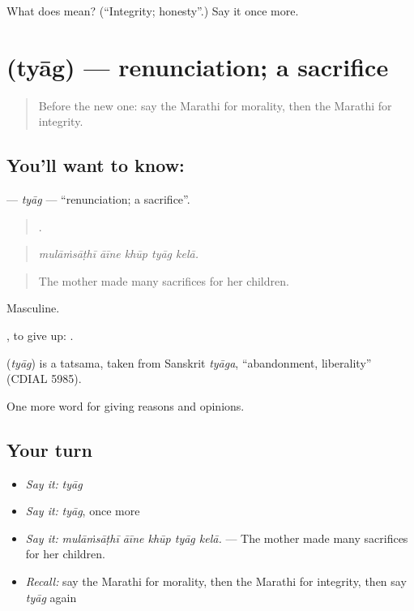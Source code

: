 \begin{tcolorbox}[breakable,colback=teal!4,colframe=teal!35!black,title={Before you move on}]
What does  mean? (\textquotedblleft{}Integrity; honesty\textquotedblright{}.) Say it once more.
\end{tcolorbox}
\section[\texorpdfstring{\mr{त्याग} (tyāg)}{त्याग (tyāg)}]{ (tyāg) — renunciation; a sacrifice}

\label{lesson:MR-C366-tyag}



\begin{quote}
Before the new one: say the Marathi for morality, then the Marathi for integrity.
\end{quote}

\subsection*{You'll want to know: }
\textbf{} — \emph{tyāg} — \textquotedblleft{}renunciation; a sacrifice\textquotedblright{}.

\begin{quote}
    .
\end{quote}

\begin{quote}
\emph{mulāṁsāṭhī āīne khūp tyāg kelā.}
\end{quote}

\begin{quote}
The mother made many sacrifices for her children.
\end{quote}

Masculine.

 , to give up:  .

\begin{cousinweb}
\textbf{} (\emph{tyāg}) is a tatsama, taken from Sanskrit \emph{tyāga}, \textquotedblleft{}abandonment, liberality\textquotedblright{} (CDIAL 5985).
\end{cousinweb}

\begin{grammarlens}[title={What you've built}]
One more word for giving reasons and opinions.
\end{grammarlens}

\subsection*{Your turn}
\begin{itemize}
\raggedright
  \item \emph{Say it:} \emph{tyāg}
  \item \emph{Say it:} \emph{tyāg}, once more
  \item \emph{Say it:} \emph{mulāṁsāṭhī āīne khūp tyāg kelā.} — The mother made many sacrifices for her children.
  \item \emph{Recall:} say the Marathi for morality, then the Marathi for integrity, then say \emph{tyāg} again
\end{itemize}

